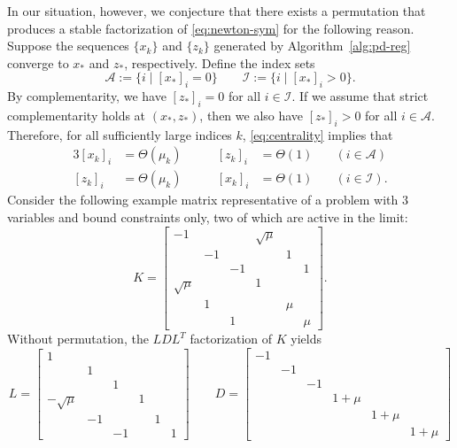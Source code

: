 \documentclass{amsart}
\begin{document}
In our situation, however, we conjecture that there exists a permutation that
produces a stable factorization of \eqref{eq:newton-sym} for the following
reason. Suppose the sequences $\{x_k\}$ and $\{z_k\}$ generated by
Algorithm~\ref{alg:pd-reg} converge to $x_*$ and $z_*$, respectively. Define
the index sets
\[
  \mathcal{A} := \{ i \mid [x_*]_i = 0 \} \qquad
  \mathcal{I} := \{ i \mid [x_*]_i > 0 \}.
\]
By complementarity, we have $[z_*]_i = 0$ for all $i \in \mathcal{I}$. If we
assume that strict complementarity holds at $(x_*, z_*)$, then we also have
$[z_*]_i > 0$ for all $i \in \mathcal{A}$. Therefore, for all sufficiently
large indices $k$, \eqref{eq:centrality} implies that
\begin{alignat}{3}
  [x_k]_i & = \Theta(\mu_k) \qquad & [z_k]_i & = \Theta(1) \quad &
  (i \in \mathcal{A}) \\
  [z_k]_i & = \Theta(\mu_k) \qquad & [x_k]_i & = \Theta(1) \quad &
  (i \in \mathcal{I}).
\end{alignat}
Consider the following example matrix representative of a problem with $3$
variables and bound constraints only, two of which are active in the limit:
\[
  K =
  \begin{bmatrix}
    -1          &    &    & \sqrt{\mu} &     &   \\
                & -1 &    &            & 1   &   \\
                &    & -1 &            &     & 1 \\
     \sqrt{\mu} &    &    & 1          &     &   \\
                &  1 &    &            & \mu &   \\
                &    &  1 &            &     & \mu
  \end{bmatrix}.
\]
Without permutation, the $LDL^T$ factorization of $K$ yields
\[
  L =
  \begin{bmatrix}
    1 &&&&& \\
    & 1 &&&& \\
    && 1 &&& \\
    -\sqrt{\mu} &&& 1 && \\
    & -1 &&& 1 & \\
    && -1 &&& 1
  \end{bmatrix}
  \qquad
  D =
  \begin{bmatrix}
    -1 &&&&& \\
    & -1 &&&& \\
    && -1 &&& \\
    &&& 1+\mu && \\
    &&&& 1+\mu & \\
    &&&&& 1+\mu
  \end{bmatrix}
\]
\end{document}
